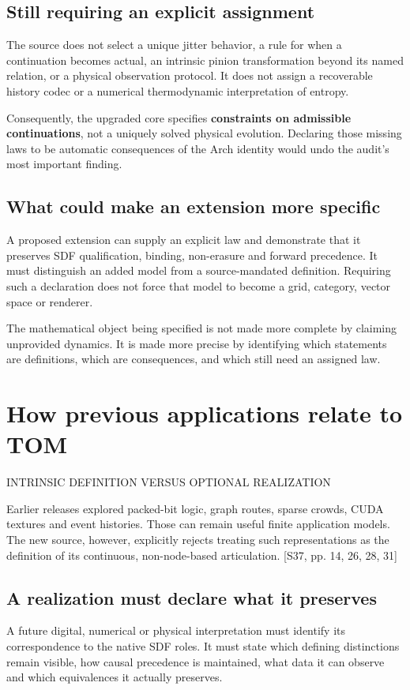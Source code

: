 \documentclass[11pt,a4paper]{article}
\newcommand{\newsec}[2]{\clearpage\section{#1}{\sffamily\footnotesize\color{teal}\MakeUppercase{#2}\par}\vspace{5pt}}
\newcommand{\src}[1]{{\small\color{muted}[S37, #1]}}
\begin{document}
\subsection{Still requiring an explicit assignment}
The source does not select a unique jitter behavior, a rule for when a continuation becomes actual, an intrinsic pinion transformation beyond its named relation, or a physical observation protocol. It does not assign a recoverable history codec or a numerical thermodynamic interpretation of entropy.

Consequently, the upgraded core specifies \textbf{constraints on admissible continuations}, not a uniquely solved physical evolution. Declaring those missing laws to be automatic consequences of the Arch identity would undo the audit's most important finding.

\subsection{What could make an extension more specific}
A proposed extension can supply an explicit law and demonstrate that it preserves SDF qualification, binding, non-erasure and forward precedence. It must distinguish an added model from a source-mandated definition. Requiring such a declaration does not force that model to become a grid, category, vector space or renderer.

\begin{boxx}
The mathematical object being specified is not made more complete by claiming unprovided dynamics. It is made more precise by identifying which statements are definitions, which are consequences, and which still need an assigned law.
\end{boxx}

\newsec{How previous applications relate to TOM}{Intrinsic definition versus optional realization}
Earlier releases explored packed-bit logic, graph routes, sparse crowds, CUDA textures and event histories. Those can remain useful finite application models. The new source, however, explicitly rejects treating such representations as the definition of its continuous, non-node-based articulation. \src{pp. 14, 26, 28, 31}

\subsection{A realization must declare what it preserves}
A future digital, numerical or physical interpretation must identify its correspondence to the native SDF roles. It must state which defining distinctions remain visible, how causal precedence is maintained, what data it can observe and which equivalences it actually preserves.
\end{document}
